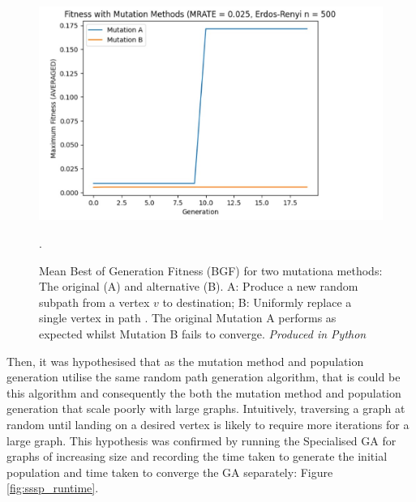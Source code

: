 \documentclass[
	a4paper, %
	10pt, %
	unnumberedsections, %
	twoside, %
]{LTJournalArticle}
\begin{document}
\begin{figure}
	\includegraphics[width=\linewidth]{Figures/sims/mutation/mutation_comparison.jpg}
	\caption{Mean Best of Generation Fitness (BGF) for two mutationa methods: The original (A) and alternative (B). A: Produce a new random subpath from a vertex \(v\) to destination; B: Uniformly replace a single vertex in path . The original Mutation A performs as expected whilst Mutation B fails to converge. \emph{Produced in Python}}. 
	\label{fig:mutation_comparison}
\end{figure}

Then, it was hypothesised that as the mutation method and population generation utilise the same random path generation algorithm, that is could be this algorithm and consequently the both the mutation method and population generation that scale poorly with large graphs. Intuitively, traversing a graph at random until landing on a desired vertex is likely to require more iterations for a large graph. This hypothesis was confirmed by running the Specialised GA for graphs of increasing size and recording the time taken to generate the initial population and time taken to converge the GA separately: Figure \ref{fig:sssp_runtime}. 
\end{document}
